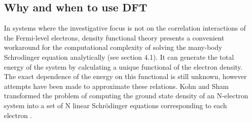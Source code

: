 \documentclass[10pt]{article}
\begin{document}












\subsection{Why and when to use DFT}
In systems where the investigative focus is not on the correlation interactions of the Fermi-level electrons, density functional theory presents a convenient workaround for the computational complexity of solving the many-body Schrodinger equation analytically (see section 4.1). It can generate the total energy of the system by calculating a unique functional of the electron density. The exact dependence of the energy on this functional is still unknown, however attempts have been made to approximate these relations. Kohn and Sham transformed the problem of computing the ground state density of an N-electron system into a set of N linear Schrödinger equations corresponding to each electron \cite{kohn1965self}. 
\end{document}
